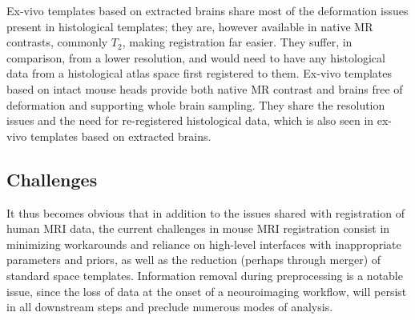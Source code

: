 Ex-vivo templates based on extracted brains share most of the deformation issues present in histological templates;
they are, however available in native MR contrasts, commonly $T_2$, making registration far easier.
They suffer, in comparison, from a lower resolution, and would need to have any histological data from a histological atlas space first registered to them.
Ex-vivo templates based on intact mouse heads provide both native MR contrast and brains free of deformation and supporting whole brain sampling.
They share the resolution issues and the need for re-registered histological data, which is also seen in ex-vivo templates based on extracted brains.

\subsection{Challenges}
It thus becomes obvious that in addition to the issues shared with registration of human MRI data, the current challenges in mouse MRI registration consist in minimizing workarounds and reliance on high-level interfaces with inappropriate parameters and priors, as well as the reduction (perhaps through merger) of standard space templates.
Information removal during preprocessing is a notable issue, since the loss of data at the onset of a neouroimaging workflow, will persist in all downstream steps and preclude numerous modes of analysis.

